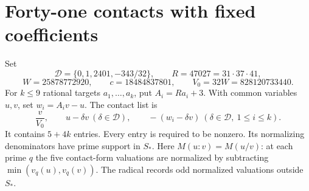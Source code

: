 \section{Forty-one contacts with fixed coefficients}\label{sec:sp-contacts}

Set
\[
 \mathcal D=\{0,1,2401,-343/32\},\qquad
 R=47027=31\cdot37\cdot41,
\]
\[
 W=25878772920,\qquad c=18484837801,
 \qquad V_0=32W=828120733440.
\]
For $k\le9$ rational targets $a_1,\ldots,a_k$, put
$A_i=Ra_i+3$. With common variables $u,v$, set $w_i=A_iv-u$.
The contact list is
\begin{equation}\label{eq:sp-fixed-contacts}
 \frac v{V_0},\qquad u-\delta v\ (\delta\in\mathcal D),
 \qquad -(w_i-\delta v)\
       (\delta\in\mathcal D,\ 1\le i\le k).
\end{equation}
It contains $5+4k$ entries. Every entry is required to be nonzero.
Its normalizing denominators have prime support in $S_*$. Here
$M(u:v)=M(u/v)$: at each prime $q$ the five contact-form valuations
are normalized by subtracting $\min(v_q(u),v_q(v))$. The radical
records odd normalized valuations outside $S_*$.

